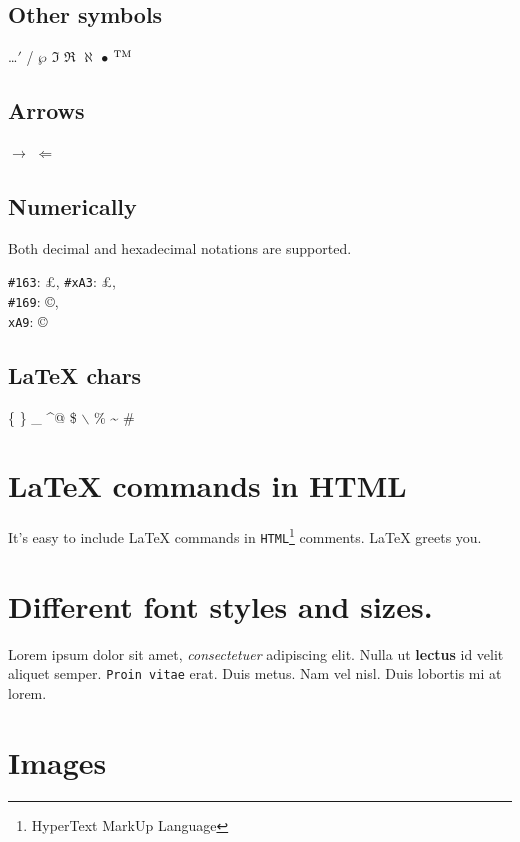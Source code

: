 \documentclass[a4paper,11pt]{article} \usepackage{ulem}
\newcommand{\MYp}[1]{ {\color[rgb]{0.392,0.392,0.392}#1} }
\begin{document}
\subsection{Other symbols}

\MYp{\ldots $\prime$ / $\wp$ $\Im$ $\Re$ $\aleph$ $\bullet$ $^{\rm
    TM}$}

\subsection{Arrows}

\MYp{$\rightarrow$ $\Leftarrow$}

\subsection{Numerically}

\MYp{Both decimal and hexadecimal notations are supported.}

\MYp{\texttt{\#163}: \pounds, \texttt{\#xA3}: \pounds,
  \\\texttt{\#169}: \copyright, \\\texttt{xA9}: \copyright }

\subsection{LaTeX chars}

\MYp{\{ \} \_ \textasciicircum @ \$ $\backslash$ \% \textasciitilde
  \#}

\section{LaTeX commands in HTML}

\MYp{It's easy to include LaTeX commands in
  \texttt{HTML}\footnote{HyperText MarkUp Language} comments.
  \LaTeX{} greets you.  }

\section{Different font styles and sizes.}

\MYp{Lorem ipsum {\Huge dolor} sit amet, \textit{consectetuer}
  adipiscing elit. Nulla ut \textbf{lectus} id velit aliquet semper.
  \texttt{Proin vitae} erat. Duis metus. Nam vel nisl. Duis
  \scriptsize lobortis \normalsize mi at {\tiny
    lorem}.}\hypertarget{img}{}

\section{Images}
\end{document}
